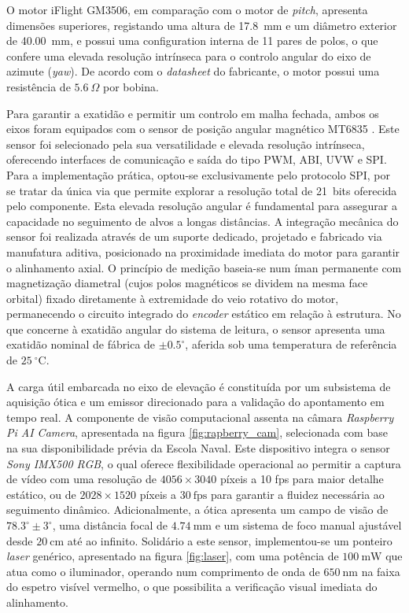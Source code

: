 O motor iFlight GM3506, em comparação com o motor de \emph{pitch}, apresenta dimensões superiores, registando uma altura de 17.8~mm e um diâmetro exterior de 40.00~mm, e possui uma configuration interna de 11 pares de polos, o que confere uma elevada resolução intrínseca para o controlo angular do eixo de azimute (\emph{yaw}). De acordo com o \emph{datasheet} do fabricante, o motor possui uma resistência de $5.6~\Omega$ por bobina.


Para garantir a exatidão e permitir um controlo em malha fechada, ambos os eixos foram equipados com o sensor de posição angular magnético MT6835 \parencite{magntek2024mt6835}. Este sensor foi selecionado pela sua versatilidade e elevada resolução intrínseca, oferecendo interfaces de comunicação e saída do tipo PWM, ABI, UVW e \ac{SPI}. Para a implementação prática, optou-se exclusivamente pelo protocolo \ac{SPI}, por se tratar da única via que permite explorar a resolução total de 21~bits oferecida pelo componente. Esta elevada resolução angular é fundamental para assegurar a capacidade no seguimento de alvos a longas distâncias. A integração mecânica do sensor foi realizada através de um suporte dedicado, projetado e fabricado via manufatura aditiva, posicionado na proximidade imediata do motor para garantir o alinhamento axial. O princípio de medição baseia-se num íman permanente com magnetização diametral (cujos polos magnéticos se dividem na mesma face orbital) fixado diretamente à extremidade do veio rotativo do motor, permanecendo o circuito integrado do \emph{encoder} estático em relação à estrutura. No que concerne à exatidão angular do sistema de leitura, o sensor apresenta uma exatidão nominal de fábrica de $\pm 0.5^\circ$, aferida sob uma temperatura de referência de $25~^\circ\text{C}$.
    
A carga útil embarcada no eixo de elevação é constituída por um subsistema de aquisição ótica e um emissor direcionado para a validação do apontamento em tempo real. A componente de visão computacional assenta na câmara \emph{Raspberry Pi AI Camera}, apresentada na figura \ref{fig:rapberry_cam}, selecionada com base na sua disponibilidade prévia da Escola Naval. Este dispositivo integra o sensor \emph{Sony IMX500 RGB}, o qual oferece flexibilidade operacional ao permitir a captura de vídeo com uma resolução de $4056\times3040$ píxeis a 10 fps para maior detalhe estático, ou de $2028\times1520$ píxeis a $30~\text{fps}$ para garantir a fluidez necessária ao seguimento dinâmico. Adicionalmente, a ótica apresenta um campo de visão de $78.3^\circ \pm 3^\circ$, uma distância focal de $4.74~\text{mm}$ e um sistema de foco manual ajustável desde $20~\text{cm}$ até ao infinito. Solidário a este sensor, implementou-se um ponteiro \emph{laser} genérico, apresentado na figura \ref{fig:laser}, com uma potência de $100~\text{mW}$ que atua como o iluminador, operando num comprimento de onda de $650~\text{nm}$ na faixa do espetro visível vermelho, o que possibilita a verificação visual imediata do alinhamento.

